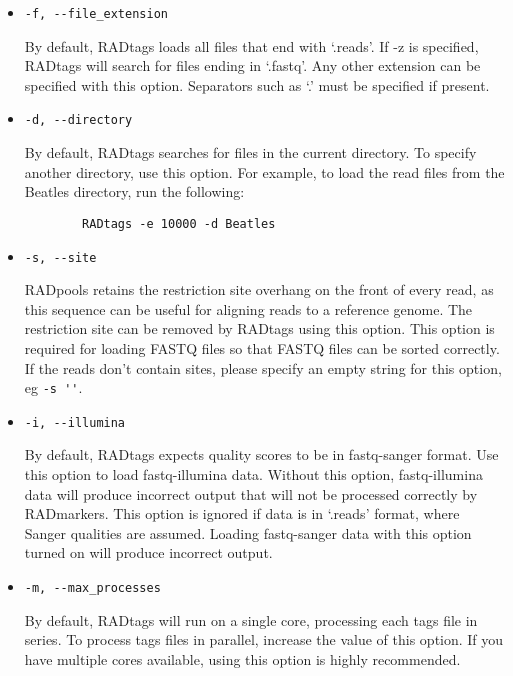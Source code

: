 \documentclass[a4paper]{article}
\begin{document}
\begin{itemize}
    \item \verb|-f, --file_extension|
    
    By default, RADtags loads all files that end with `.reads'. If -z is specified, RADtags will search for files ending in `.fastq'. Any other extension can be specified with this option. Separators such as `.' must be specified if present.
    
    \item \verb|-d, --directory|
    
    By default, RADtags searches for files in the current directory. To specify another directory, use this option. For example, to load the read files from the Beatles directory, run the following:
    
    \begin{verbatim}
        RADtags -e 10000 -d Beatles
    \end{verbatim}
    
    \item \verb|-s, --site|
    
    RADpools retains the restriction site overhang on the front of every read, as this sequence can be useful for aligning reads to a reference genome. The restriction site can be removed by RADtags using this option. This option is required for loading FASTQ files so that FASTQ files can be sorted correctly. If the reads don't contain sites, please specify an empty string for this option, eg \verb|-s ''|.

    \item \verb|-i, --illumina|
    
    By default, RADtags expects quality scores to be in fastq-sanger format. Use this option to load fastq-illumina data. Without this option, fastq-illumina data will produce incorrect output that will not be processed correctly by RADmarkers. This option is ignored if data is in `.reads' format, where Sanger qualities are assumed. Loading fastq-sanger data with this option turned on will produce incorrect output.
    
    \item \verb|-m, --max_processes|
    
    By default, RADtags will run on a single core, processing each tags file in series. To process tags files in parallel, increase the value of this option. If you have multiple cores available, using this option is highly recommended.

\end{itemize}
\end{document}
